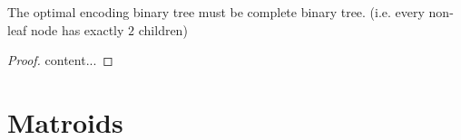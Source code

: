\begin{lemma}{}{}
	The optimal encoding binary tree must be complete binary tree. (i.e. every non-leaf node has exactly $2$ children)
\end{lemma}
\begin{proof}
	content...
\end{proof}









\section{Matroids}